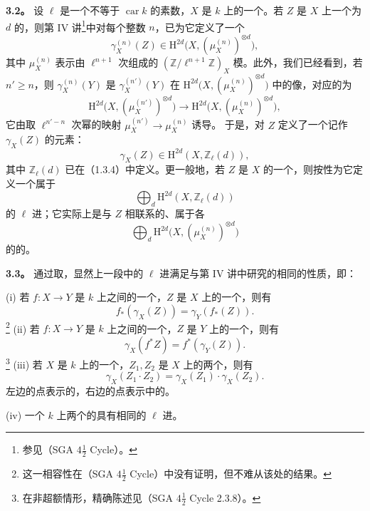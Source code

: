 \textbf{3.2。} 设 $\ell$ 是一个不等于 $\operatorname{car}k$ 的素数，$X$ 是 $k$ 上的一个。若 $Z$ 是 $X$ 上一个为 $d$ 的，则第 IV 讲\footnote{参见（SGA $4\frac12$ Cycle）。}中对每个整数 $n$，已为它定义了一个
\[
\gamma_X^{(n)}(Z)\in\mathrm H^{2d}\bigl(X,(\mu_X^{(n)})^{\otimes d}\bigr),
\]
其中 $\mu_X^{(n)}$ 表示由 $\ell^{n+1}$ 次组成的 $(\mathbb Z/\ell^{n+1}\mathbb Z)_X$ 模。此外，我们已经看到，若 $n'\geq n$，则 $\gamma_X^{(n)}(Y)$ 是 $\gamma_X^{(n')}(Y)$ 在 $\mathrm H^{2d}\bigl(X,(\mu_X^{(n)})^{\otimes d}\bigr)$ 中的像，对应的为
\[
\mathrm H^{2d}\bigl(X,(\mu_X^{(n')})^{\otimes d}\bigr)
\longrightarrow\mathrm H^{2d}\bigl(X,(\mu_X^{(n)})^{\otimes d}\bigr),
\]
它由取 $\ell^{n'-n}$ 次幂的映射 $\mu_X^{(n')}\to\mu_X^{(n)}$ 诱导。
于是，对 $Z$ 定义了一个记作 $\gamma_X(Z)$ 的元素：
\[
\gamma_X(Z)\in\mathrm H^{2d}(X,\mathbb Z_\ell(d)),
\]
其中 $\mathbb Z_\ell(d)$ 已在（1.3.4）中定义。更一般地，若 $Z$ 是 $X$ 的一个，则按性为它定义一个属于
\[
\bigoplus_d\mathrm H^{2d}(X,\mathbb Z_\ell(d))
\]
的 $\ell$ 进；它实际上是与 $Z$ 相联系的、属于各
\[
\bigoplus_d\mathrm H^{2d}\bigl(X,(\mu_X^{(n)})^{\otimes d}\bigr)
\]
的的。

\textbf{3.3。} 通过取，显然上一段中的 $\ell$ 进满足与第 IV 讲中研究的相同的性质，即：

(i) 若 $f:X\to Y$ 是 $k$ 上之间的一个，$Z$ 是 $X$ 上的一个，则有
\[
f_*(\gamma_X(Z))=\gamma_Y(f_*(Z)).
\]
\footnote{这一相容性在（SGA $4\frac12$ Cycle）中没有证明，但不难从该处的结果。}
(ii) 若 $f:X\to Y$ 是 $k$ 上之间的一个，$Z$ 是 $Y$ 上的一个，则有
\[
\gamma_X(f^*Z)=f^*(\gamma_Y(Z)).
\]
\footnote{在非超额情形，精确陈述见（SGA $4\frac12$ Cycle 2.3.8）。}
(iii) 若 $X$ 是 $k$ 上的一个，$Z_1,Z_2$ 是 $X$ 上的两个，则有
\[
\gamma_X(Z_1\cdot Z_2)=\gamma_X(Z_1)\cdot\gamma_X(Z_2).
\]
\footnotemark[\value{footnote}]
左边的点表示的，右边的点表示中的。

(iv) 一个 $k$ 上两个的具有相同的 $\ell$ 进。
